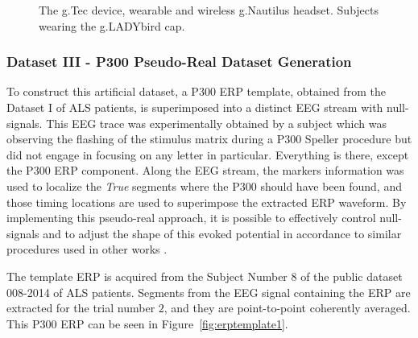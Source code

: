 \begin{figure}[H]
\caption[g.Tec Device]{The g.Tec device, wearable and wireless g.Nautilus headset. Subjects wearing the g.LADYbird cap. }
\label{fig:gtecdevice}
\end{figure}

\subsubsection{Dataset III - P300 Pseudo-Real Dataset Generation}

To construct this artificial dataset, a P300 ERP template, obtained from the Dataset I of ALS patients, is superimposed into a distinct EEG stream with null-signals.  This EEG trace was experimentally obtained by a subject which was observing the flashing of the stimulus matrix during a P300 Speller procedure but did not engage in focusing on any letter in particular. Everything is there, except the P300 ERP component. Along the EEG stream, the markers information was used to localize the \textit{True} segments where the P300 should have been found, and those timing locations are used to superimpose the extracted ERP waveform.  By implementing this pseudo-real approach, it is possible to effectively control null-signals and to adjust the shape of this evoked potential in accordance to similar procedures used in other works \cite{Ouyang2017,Jaskowski2000,QuianQuiroga2003}.

The template ERP is acquired from the Subject Number $8$ of the public dataset 008-2014 of ALS patients.  Segments from the EEG signal containing the ERP are extracted for the trial number $2$, and they are point-to-point coherently averaged.  This P300 ERP can be seen in Figure~\ref{fig:erptemplate1}. 

